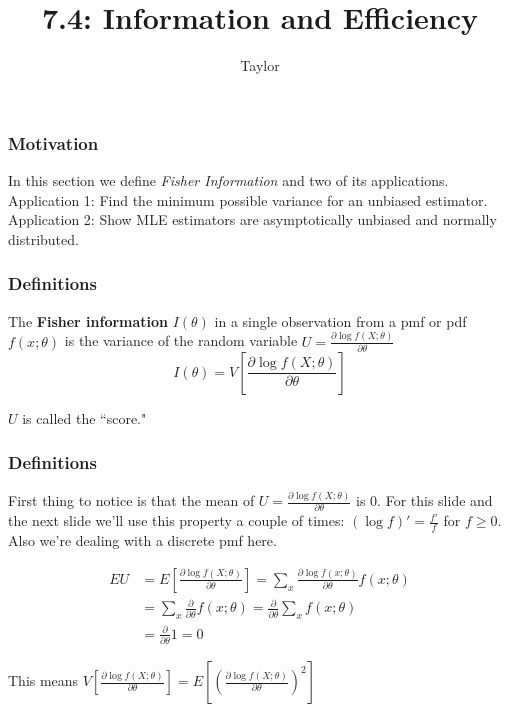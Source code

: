 \documentclass{beamer}
\title["7.4"]{7.4: Information and Efficiency}
\author{Taylor}
\institute[UVA] 
{
University of Virginia \\
\medskip
\textit{} 
}
\date{}
\begin{document}

\begin{frame}
\titlepage 
\end{frame}

\begin{frame}
\frametitle{Motivation}

In this section we define \emph{Fisher Information} and two of its applications. Application 1: Find the minimum possible variance for an unbiased estimator. Application 2: Show MLE estimators are asymptotically unbiased and normally distributed. 

\end{frame}
\begin{frame}
\frametitle{Definitions}

The \textbf{Fisher information} $I(\theta)$ in a single observation from a pmf or pdf $f(x;\theta)$ is the variance of the random variable $U = \frac{\partial \log f(X;\theta)}{ \partial \theta}$
\[
I(\theta) = V\left[ \frac{\partial \log f(X;\theta)}{ \partial \theta} \right]
\]

\pause
$U$ is called the ``score."

\end{frame}


\begin{frame}
\frametitle{Definitions}

First thing to notice is that the mean of $U = \frac{\partial \log f(X;\theta)}{ \partial \theta}$ is $0$. For this slide and the next slide we'll use this property a couple of times: $(\log f)' = \frac{f'}{f}$ for $f \ge 0$. Also we're dealing with a discrete pmf here.
\newline

\begin{align}
EU &= E \left[\frac{\partial \log f(X;\theta)}{ \partial \theta} \right] = \sum_{x} \frac{\partial \log f(x;\theta)}{ \partial \theta} f(x; \theta)\\
&= \sum_x \frac{\partial}{\partial \theta} f(x;\theta) = \frac{\partial}{\partial \theta} \sum_x f(x;\theta)\\
&= \frac{\partial}{\partial \theta} 1 =0
\end{align}

This means $V\left[ \frac{\partial \log f(X;\theta)}{ \partial \theta} \right] = E\left[ \left(\frac{\partial \log f(X;\theta)}{ \partial \theta}\right)^2 \right]$

\end{frame}
\end{document}
